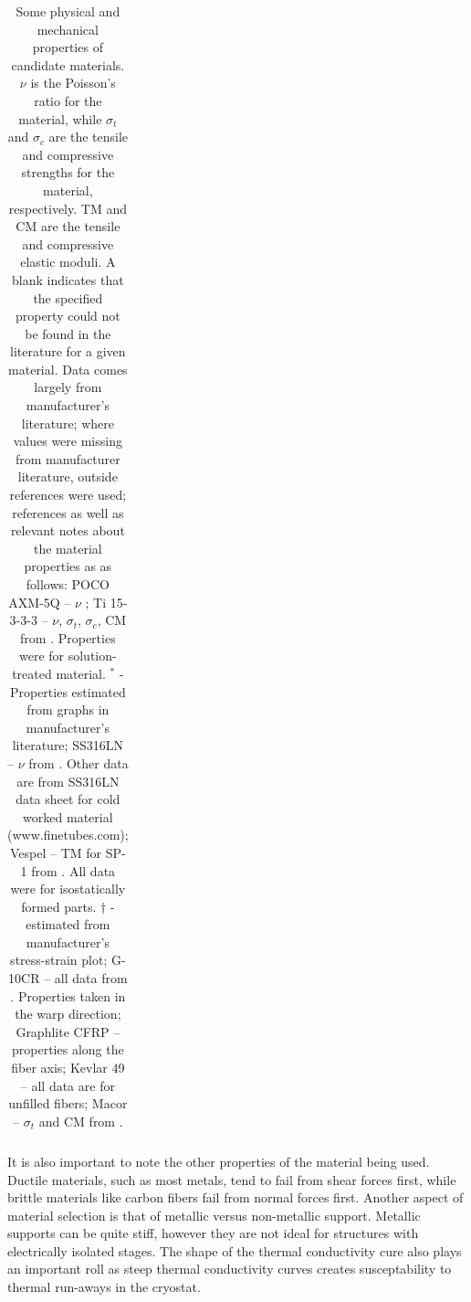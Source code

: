 \documentclass[final]{svjour2}
\begin{document}
\begin{table}[h]
\begin{tabular}{lrrrrrr}
 \bottomrule
\end{tabular}
\caption{Some physical and mechanical properties of candidate materials. $\nu$ is the Poisson's ratio for the material, while $\sigma_{t}$ and $\sigma_{c}$ are the tensile and compressive strengths for the material, respectively. TM and CM are the tensile and compressive elastic moduli. A blank indicates that the specified property could not be found in the literature for a given material. Data comes largely from manufacturer's literature; where values were missing from manufacturer literature, outside references were used; references as well as relevant notes about the material properties as as follows: POCO AXM-5Q -- $\nu$ \cite{Swank2009}; Ti 15-3-3-3 -- $\nu$, $\sigma_t$, $\sigma_c$, CM from \cite{Lang2001}\cite{Johnson1996}\cite{Nyakana2005}. Properties were for solution-treated material. $^*$ - Properties estimated from graphs in manufacturer's literature; SS316LN -- $\nu$ from \cite{Shankar2001}. Other data are from SS316LN data sheet for cold worked material (www.finetubes.com); Vespel -- TM for SP-1 from \cite{Doty1981}. All data were for isostatically formed parts. $\dag$ - estimated from manufacturer's stress-strain plot; G-10CR -- all data from \cite{Kasen1981}\cite{Markley1985}. Properties taken in the warp direction; Graphlite CFRP -- properties along the fiber axis; Kevlar 49 -- all data are for unfilled fibers; Macor -- $\sigma_t$ and CM from \cite{Markley1985}\cite{websiteMacor}.}
\label{SW}
\end{table}

It is also important to note the other properties of the material being used.  Ductile materials, such as most metals, tend to fail from shear forces first, while brittle materials like carbon fibers fail from normal forces first.  Another aspect of material selection is that of metallic versus non-metallic support. Metallic supports can be quite stiff, however they are not ideal for structures with electrically isolated stages.  The shape of the thermal conductivity cure also plays an important roll as steep thermal conductivity curves creates susceptability to thermal run-aways in the cryostat.
\end{document}
